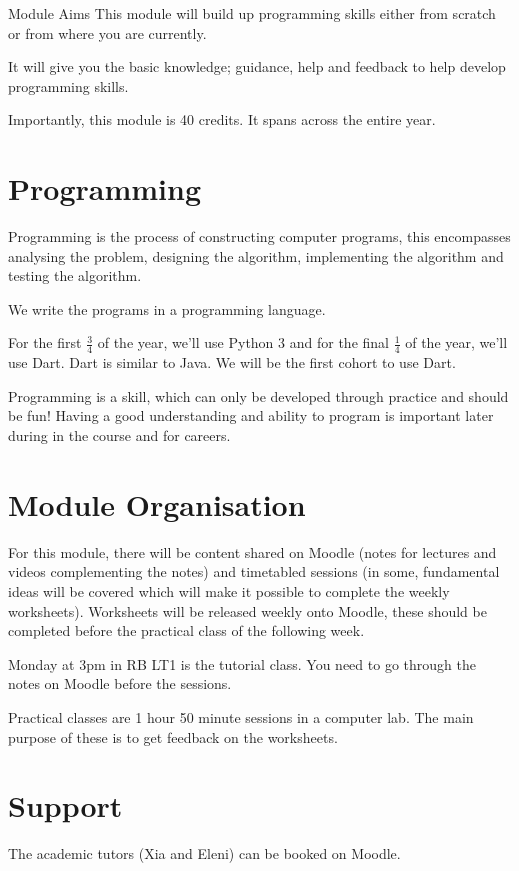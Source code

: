 
\begin{keyconcept}{Module Aims}
This module will build up programming skills either from scratch or from where you are currently. 

It will give you the basic knowledge; guidance, help and feedback to help develop programming skills.
\end{keyconcept}
Importantly, this module is 40 credits. It spans across the entire year.

\section*{Programming}
Programming is the process of constructing computer programs, this encompasses analysing the problem, designing the algorithm, implementing the algorithm and testing the algorithm.

We write the programs in a programming language.

For the first $\frac{3}{4}$ of the year, we'll use Python 3 and for the final $\frac{1}{4}$ of the year, we'll use Dart. Dart is similar to Java. We will be the first cohort to use Dart.

Programming is a skill, which can only be developed through practice and should be fun!
Having a good understanding and ability to program is important later during in the course and for careers.

\section*{Module Organisation}
For this module, there will be content shared on Moodle (notes for lectures and videos complementing the notes) and timetabled sessions (in some, fundamental ideas will be covered which will make it possible to complete the weekly worksheets). Worksheets will be released weekly onto Moodle, these should be completed before the practical class of the following week.

Monday at 3pm in RB LT1 is the tutorial class. You need to go through the notes on Moodle before the sessions.

Practical classes are 1 hour 50 minute sessions in a computer lab. The main purpose of these is to get feedback on the worksheets.

\section*{Support}
The academic tutors (Xia and Eleni) can be booked on Moodle.

